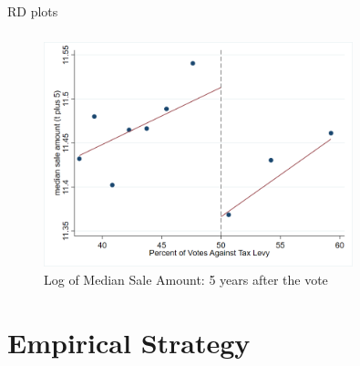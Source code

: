 \documentclass{beamer}
\begin{document}
\begin{frame}{RD plots}
    \frametitle{}
    \label{main_rd}

    \begin{figure}[htbp]
        \centering
        \includegraphics[width=0.8\textwidth]{assets/imgs/rd_plot_median_sale_amount_t_plus_5_tri_mserd_1_2_within.png}
        \caption{Log of Median Sale Amount: 5 years after the vote}
        \label{fig:rd_plot}
    \end{figure}

    \begin{center}
        \hyperlink{all_rd}{}
    \end{center}

\end{frame}

\section{Empirical Strategy}
\end{document}
